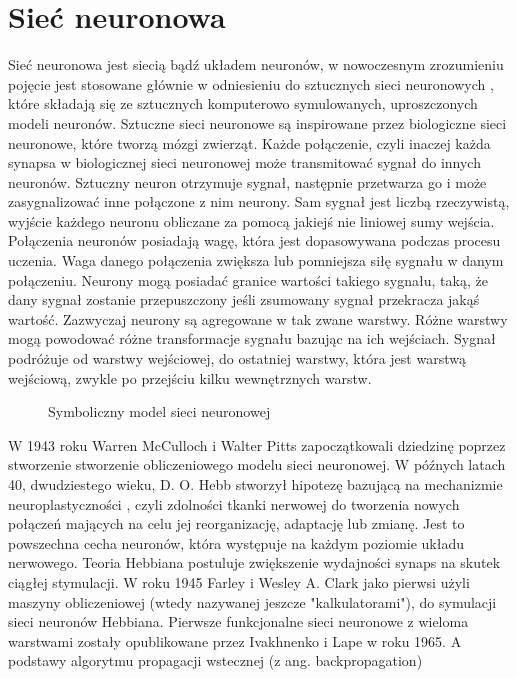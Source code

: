 \section{Sieć neuronowa}

Sieć neuronowa \cite{NeuralNetwork} \cite{ArtificialNeuralNetwork} \cite{DeepLearningFromScratch} \cite{HandsOnMachineLearning} jest siecią bądź układem neuronów, w nowoczesnym zrozumieniu pojęcie jest stosowane głównie w odniesieniu do sztucznych sieci neuronowych , które składają się ze sztucznych komputerowo symulowanych, uproszczonych modeli neuronów. Sztuczne sieci neuronowe są inspirowane przez biologiczne sieci neuronowe, które tworzą mózgi zwierząt.
Każde połączenie, czyli inaczej każda synapsa w biologicznej sieci neuronowej może transmitować sygnał do innych neuronów. Sztuczny neuron otrzymuje sygnał, następnie przetwarza go i może zasygnalizować inne połączone z nim neurony. Sam sygnał jest liczbą rzeczywistą, wyjście każdego neuronu obliczane za pomocą jakiejś nie liniowej sumy wejścia. Połączenia neuronów posiadają wagę, która jest dopasowywana podczas procesu uczenia. Waga danego połączenia zwiększa lub pomniejsza siłę sygnału w danym połączeniu. Neurony mogą posiadać granice wartości takiego sygnału, taką, że dany sygnał zostanie przepuszczony jeśli zsumowany sygnał przekracza jakąś wartość. Zazwyczaj neurony są agregowane w tak zwane warstwy. Różne warstwy mogą powodować różne transformacje sygnału bazując na ich wejściach. Sygnał podróżuje od warstwy wejściowej, do ostatniej warstwy, która jest warstwą wejściową, zwykle po przejściu kilku wewnętrznych warstw.


\begin{figure}[h]
    \centering
    \caption{Symboliczny model sieci neuronowej \cite{ColoredNeuralNetwork}}
    \label{img:nn_symbolic_diagram}
\end{figure}


\clearpage


W 1943 roku Warren McCulloch i Walter Pitts zapoczątkowali dziedzinę poprzez stworzenie stworzenie obliczeniowego modelu sieci neuronowej. W późnych latach 40, dwudziestego wieku, D. O. Hebb stworzył hipotezę bazującą na mechanizmie neuroplastyczności \cite{Neuroplastycznosc}, czyli zdolności tkanki nerwowej do tworzenia nowych połączeń mających na celu jej reorganizację, adaptację lub zmianę. Jest to powszechna cecha neuronów, która występuje na każdym poziomie układu nerwowego. Teoria Hebbiana postuluje zwiększenie wydajności synaps na skutek ciągłej stymulacji. W roku 1945 Farley i Wesley A. Clark jako pierwsi użyli maszyny obliczeniowej (wtedy nazywanej jeszcze "kalkulatorami"), do symulacji sieci neuronów Hebbiana. Pierwsze funkcjonalne sieci neuronowe z wieloma warstwami zostały opublikowane przez Ivakhnenko i Lape w roku 1965. A podstawy algorytmu propagacji wstecznej (z ang. backpropagation)






